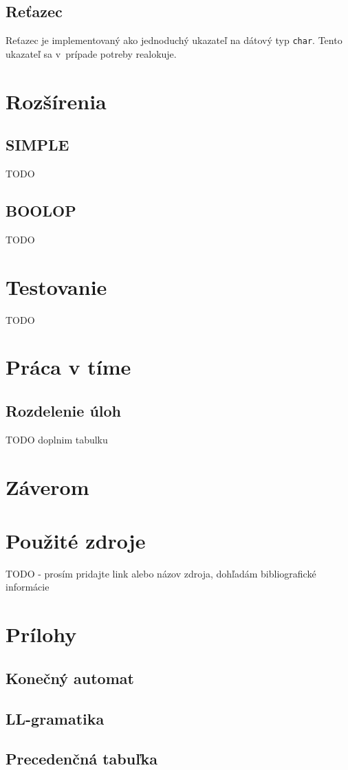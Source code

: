 \documentclass[11pt,a4paper]{article}
\begin{document}
        \subsection{Reťazec}
        Reťazec je implementovaný ako jednoduchý ukazateľ na dátový typ \texttt{char}. Tento ukazateľ sa v~prípade potreby
        realokuje.

\section{Rozšírenia} 
\label{rozsirenia}

    \subsection{SIMPLE}
    
    TODO
    
    \subsection{BOOLOP}
    
    TODO
    
\section{Testovanie} 
\label{testovanie}

TODO

\section{Práca v tíme} 
\label{tim}

    \subsection{Rozdelenie úloh}
    
    TODO doplnim tabulku

\section{Záverom} 
\label{zaver}

\section{Použité zdroje}

TODO - prosím pridajte link alebo názov zdroja, dohľadám bibliografické informácie

\section{Prílohy}


\subsection{Konečný automat}

\subsection{LL-gramatika}

\subsection{Precedenčná tabuľka}
\end{document}
